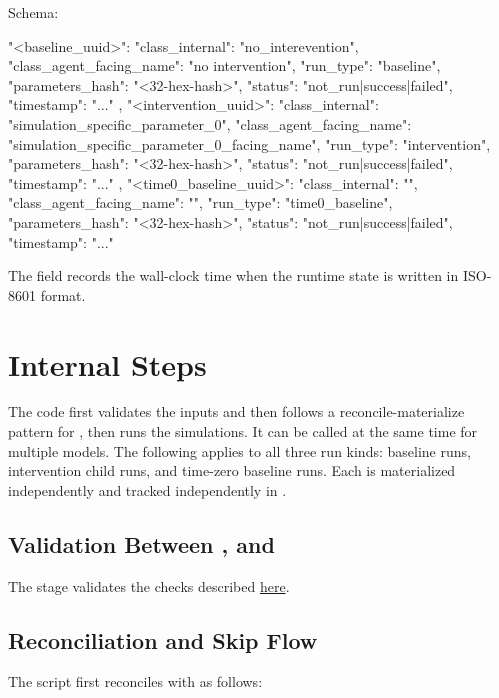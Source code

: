 \documentclass[11pt]{article}
\begin{document}
\begin{itemize}
Schema:

\begin{DocCode}
{
  "<baseline_uuid>": {
    "class_internal": "no_interevention",
    "class_agent_facing_name": "no intervention",
    "run_type": "baseline",
    "parameters_hash": "<32-hex-hash>",
    "status": "not_run|success|failed",
    "timestamp": "..."
  },
  "<intervention_uuid>": {
    "class_internal": "simulation_specific_parameter_0",
    "class_agent_facing_name": "simulation_specific_parameter_0_facing_name",
    "run_type": "intervention",
    "parameters_hash": "<32-hex-hash>",
    "status": "not_run|success|failed",
    "timestamp": "..."
  },
  "<time0_baseline_uuid>": {
    "class_internal": "",
    "class_agent_facing_name": "",
    "run_type": "time0_baseline",
    "parameters_hash": "<32-hex-hash>",
    "status": "not_run|success|failed",
    "timestamp": "..."
  }
}
\end{DocCode}

The  field records the wall-clock time when the runtime state is written in ISO-8601 format.
\end{itemize}



\section*{Internal Steps}
The code first validates the inputs and then follows  a reconcile-materialize pattern for , then runs the simulations.
It can be called at the same time for multiple models.
The following applies to all three run kinds: baseline runs, intervention child runs, and time-zero baseline runs. Each is materialized independently and tracked independently in .
\subsection*{Validation Between ,  and }
The stage validates the checks described \hyperref[sec:environment-validation-rules]{here}.
\subsection*{Reconciliation and Skip Flow}

The script first reconciles  with  as follows:
\end{document}
